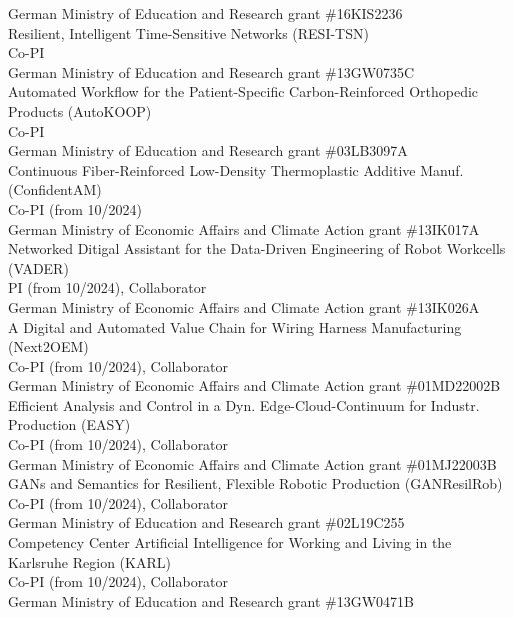 \documentclass[11pt]{article} %
\begin{document}
German Ministry of Education and Research grant \#16KIS2236\\
Resilient, Intelligent Time-Sensitive Networks (RESI-TSN)\\
Co-PI\\
German Ministry of Education and Research grant \#13GW0735C\\
Automated Workflow for the Patient-Specific Carbon-Reinforced Orthopedic Products (AutoKOOP)\\
Co-PI\\
German Ministry of Education and Research grant \#03LB3097A\\
Continuous Fiber-Reinforced Low-Density Thermoplastic Additive Manuf. (ConfidentAM)\\
Co-PI (from 10/2024)\\
German Ministry of Economic Affairs and Climate Action grant \#13IK017A\\
Networked Ditigal Assistant for the Data-Driven Engineering of Robot Workcells (VADER)\\
PI (from 10/2024), Collaborator\\
German Ministry of Economic Affairs and Climate Action grant \#13IK026A\\
A Digital and Automated Value Chain for Wiring Harness Manufacturing (Next2OEM)\\
Co-PI (from 10/2024), Collaborator\\
German Ministry of Economic Affairs and Climate Action grant \#01MD22002B\\
Efficient Analysis and Control in a Dyn. Edge-Cloud-Continuum for Industr. Production (EASY)\\
Co-PI (from 10/2024), Collaborator\\
German Ministry of Economic Affairs and Climate Action grant \#01MJ22003B\\
GANs and Semantics for Resilient, Flexible Robotic Production (GANResilRob)\\
Co-PI (from 10/2024), Collaborator\\
German Ministry of Education and Research grant \#02L19C255\\
Competency Center Artificial Intelligence for Working and Living in the Karlsruhe Region (KARL)\\
Co-PI (from 10/2024), Collaborator\\
German Ministry of Education and Research grant \#13GW0471B\\
\end{document}
